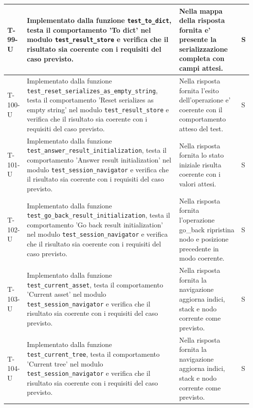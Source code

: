 \documentclass[a4paper,12pt]{article}
\begin{document}
{{\begin{longtable}{|>{\RaggedRight\arraybackslash}p{1.55cm}|>{\RaggedRight\arraybackslash}p{8.0cm}|>{\RaggedRight\arraybackslash}p{4.6cm}|>{\RaggedRight\arraybackslash}p{1.2cm}|}
        \hline
        T-99-U & Implementato dalla funzione \texttt{test\_\allowbreak to\_\allowbreak dict}, testa il comportamento 'To dict' nel modulo \texttt{test\_\allowbreak result\_\allowbreak store} e verifica che il risultato sia coerente con i requisiti del caso previsto. & Nella mappa della risposta fornita e' presente la serializzazione completa con campi attesi. & S \\
        \hline
        T-100-U & Implementato dalla funzione \texttt{test\_\allowbreak reset\_\allowbreak serializes\_\allowbreak as\_\allowbreak empty\_\allowbreak string}, testa il comportamento 'Reset serializes as empty string' nel modulo \texttt{test\_\allowbreak result\_\allowbreak store} e verifica che il risultato sia coerente con i requisiti del caso previsto. & Nella risposta fornita l'esito dell'operazione e' coerente con il comportamento atteso del test. & S \\
        \hline
        T-101-U & Implementato dalla funzione \texttt{test\_\allowbreak answer\_\allowbreak result\_\allowbreak initialization}, testa il comportamento 'Answer result initialization' nel modulo \texttt{test\_\allowbreak session\_\allowbreak navigator} e verifica che il risultato sia coerente con i requisiti del caso previsto. & Nella risposta fornita lo stato iniziale risulta coerente con i valori attesi. & S \\
        \hline
        T-102-U & Implementato dalla funzione \texttt{test\_\allowbreak go\_\allowbreak back\_\allowbreak result\_\allowbreak initialization}, testa il comportamento 'Go back result initialization' nel modulo \texttt{test\_\allowbreak session\_\allowbreak navigator} e verifica che il risultato sia coerente con i requisiti del caso previsto. & Nella risposta fornita l'operazione go\_back ripristina nodo e posizione precedente in modo coerente. & S \\
        \hline
        T-103-U & Implementato dalla funzione \texttt{test\_\allowbreak current\_\allowbreak asset}, testa il comportamento 'Current asset' nel modulo \texttt{test\_\allowbreak session\_\allowbreak navigator} e verifica che il risultato sia coerente con i requisiti del caso previsto. & Nella risposta fornita la navigazione aggiorna indici, stack e nodo corrente come previsto. & S \\
        \hline
        T-104-U & Implementato dalla funzione \texttt{test\_\allowbreak current\_\allowbreak tree}, testa il comportamento 'Current tree' nel modulo \texttt{test\_\allowbreak session\_\allowbreak navigator} e verifica che il risultato sia coerente con i requisiti del caso previsto. & Nella risposta fornita la navigazione aggiorna indici, stack e nodo corrente come previsto. & S \\

\end{longtable}}}
\end{document}
